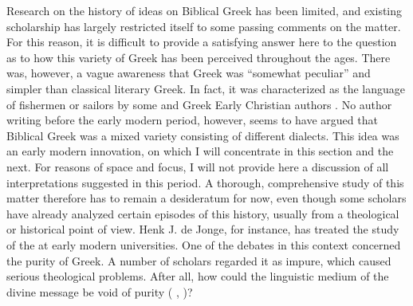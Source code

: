 Research on the history of ideas on Biblical Greek has been limited, and existing scholarship has largely restricted itself to some passing comments on the matter. For this reason, it is difficult to provide a satisfying answer here to the question as to how this variety of Greek has been perceived throughout the ages. There was, however, a vague awareness that  Greek was “somewhat peculiar” and simpler than classical literary Greek. In fact, it was characterized as the language of fishermen or sailors by some  and Greek Early Christian authors \citep[647]{Janse2007}. No author writing before the early modern period, however, seems to have argued that Biblical Greek was a mixed variety consisting of different dialects. This idea was an early modern innovation, on which I will concentrate in this section and the next. For reasons of space and focus, I will not provide here a discussion of all interpretations suggested in this period. A thorough, comprehensive study of this matter therefore has to remain a desideratum for now, even though some scholars have already analyzed certain episodes of this history, usually from a theological or historical point of view. Henk J. de Jonge, for instance, has treated the study of the  at early modern  universities. One of the debates in this context concerned the purity of  Greek. A number of scholars regarded it as impure, which caused serious theological problems. After all, how could the linguistic medium of the divine message be void of purity (\citeauthor{De1980} \citeyear[35--38]{De1980}, \citeyear[117--118]{De1981})?


